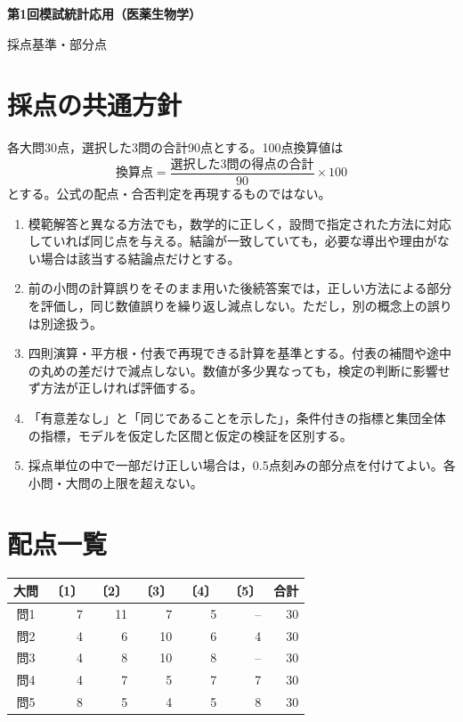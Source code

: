 \documentclass[a4paper,11pt]{ltjsarticle}
\begin{document}
\begin{center}
{\Large\bfseries 第1回模試\quad 統計応用（医薬生物学）}\par\medskip
{\large 採点基準・部分点}
\end{center}
\section*{採点の共通方針}
各大問30点，選択した3問の合計90点とする。100点換算値は
\[
\text{換算点}=\frac{\text{選択した3問の得点の合計}}{90}\times100
\]
とする。公式の配点・合否判定を再現するものではない。
\begin{enumerate}[label=\arabic*.,leftmargin=2em,itemsep=1em]
\item 模範解答と異なる方法でも，数学的に正しく，設問で指定された方法に対応していれば同じ点を与える。結論が一致していても，必要な導出や理由がない場合は該当する結論点だけとする。
\item 前の小問の計算誤りをそのまま用いた後続答案では，正しい方法による部分を評価し，同じ数値誤りを繰り返し減点しない。ただし，別の概念上の誤りは別途扱う。
\item 四則演算・平方根・付表で再現できる計算を基準とする。付表の補間や途中の丸めの差だけで減点しない。数値が多少異なっても，検定の判断に影響せず方法が正しければ評価する。
\item 「有意差なし」と「同じであることを示した」，条件付きの指標と集団全体の指標，モデルを仮定した区間と仮定の検証を区別する。
\item 採点単位の中で一部だけ正しい場合は，0.5点刻みの部分点を付けてよい。各小問・大問の上限を超えない。
\end{enumerate}
\section*{配点一覧}
\begin{center}
\begin{tabular}{crrrrrr}
\toprule
大問 & 〔1〕 & 〔2〕 & 〔3〕 & 〔4〕 & 〔5〕 & 合計\\
\midrule
問1 & 7 & 11 & 7 & 5 & -- & 30\\
問2 & 4 & 6 & 10 & 6 & 4 & 30\\
問3 & 4 & 8 & 10 & 8 & -- & 30\\
問4 & 4 & 7 & 5 & 7 & 7 & 30\\
問5 & 8 & 5 & 4 & 5 & 8 & 30\\
\bottomrule
\end{tabular}
\end{center}
\newpage
\end{document}
